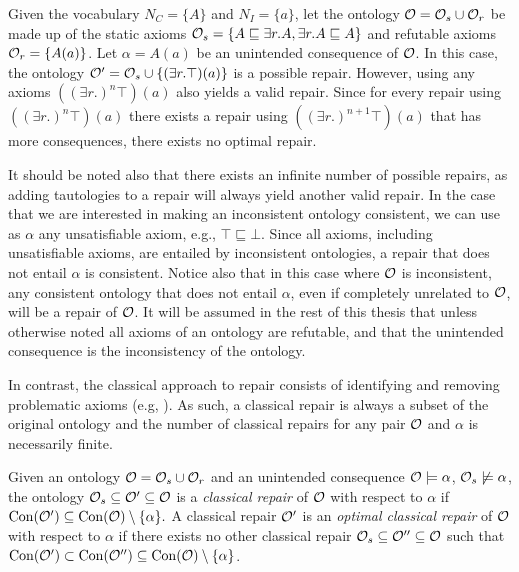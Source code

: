\begin{example}\label{ex:no-optimal}
  Given the vocabulary $N_C = \{ A \}$ and $N_I = \{ a \}$, let the ontology $\mathcal{O} = \mathcal{O}_s \cup \mathcal{O}_r$ be made up of the static axioms $\mathcal{O}_s = \{ A \sqsubseteq \exists r.A, \exists r.A \sqsubseteq A \}$ and refutable axioms $\mathcal{O}_r = \{ A(a) \}$. Let $\alpha = A(a)$ be an unintended consequence of $\mathcal{O}$. In this case, the ontology $\mathcal{O}' = \mathcal{O}_s \cup \{ (\exists r.\top) (a) \}$ is a possible repair. However, using any axioms $((\exists r.)^n\top) (a)$ also yields a valid repair. Since for every repair using $((\exists r.)^n\top) (a)$ there exists a repair using $((\exists r.)^{n + 1}\top) (a)$ that has more consequences, there exists no optimal repair.
\end{example}

It should be noted also that there exists an infinite number of possible repairs, as adding tautologies to a repair will always yield another valid repair. In the case that we are interested in making an inconsistent ontology consistent, we can use as $\alpha$ any unsatisfiable axiom, e.g., $\top \sqsubseteq \bot$. Since all axioms, including unsatisfiable axioms, are entailed by inconsistent ontologies, a repair that does not entail $\alpha$ is consistent. Notice also that in this case where $\mathcal{O}$ is inconsistent, any consistent ontology that does not entail $\alpha$, even if completely unrelated to $\mathcal{O}$, will be a repair of $\mathcal{O}$. It will be assumed in the rest of this thesis that unless otherwise noted all axioms of an ontology are refutable, and that the unintended consequence is the inconsistency of the ontology.

In contrast, the classical approach to repair consists of identifying and removing problematic axioms (e.g, \cite{schlobach2003non,kalyanpur2005debugging,kalyanpur2006repairing,BaPS07}). As such, a classical repair is always a subset of the original ontology and the number of classical repairs for any pair $\mathcal{O}$ and $\alpha$ is necessarily finite.

\begin{definition}
  Given an ontology $\mathcal{O} = \mathcal{O}_s \cup \mathcal{O}_r$ and an unintended consequence $\mathcal{O} \models \alpha$, $\mathcal{O}_s \not\models \alpha$, the ontology $\mathcal{O}_s \subseteq \mathcal{O}' \subseteq \mathcal{O}$ is a \emph{classical repair} of $\mathcal{O}$ with respect to $\alpha$ if $\mathrm{Con}(\mathcal{O}') \subseteq \mathrm{Con}(\mathcal{O}) \setminus \{\alpha\}.$ A classical repair $\mathcal{O}'$ is an \emph{optimal classical repair} of $\mathcal{O}$ with respect to $\alpha$ if there exists no other classical repair $\mathcal{O}_s \subseteq \mathcal{O}'' \subseteq \mathcal{O}$ such that $\mathrm{Con}(\mathcal{O}') \subset \mathrm{Con}(\mathcal{O}'') \subseteq \mathrm{Con}(\mathcal{O}) \setminus \{\alpha\}$.
\end{definition}

